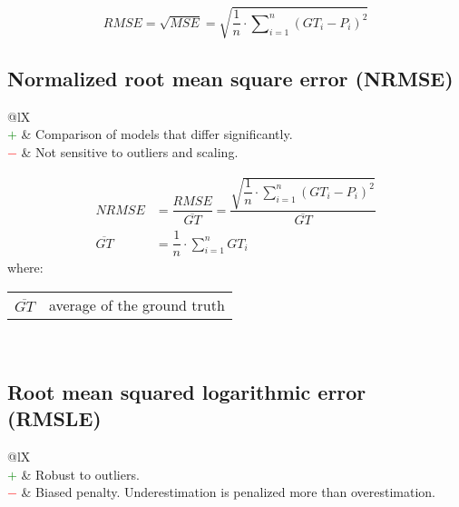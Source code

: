 \documentclass{article}
\makeatletter
\newenvironment{conditions}[1][where:]
    {\hspace{0.02\textwidth} #1 \begin{tabular}[t]{>{$}l<{$} @{${}={}$} l}}
    {\end{tabular}\\[\belowdisplayskip]}
\makeatother
\begin{document}
\begin{equation}
    \textit{RMSE} = \sqrt{\textit{MSE}} = \sqrt{\dfrac{1}{n} \cdot \sum\nolimits_{i = 1}^n (\textit{GT}_i - P_i)^2}
%
    \label{equation:RMSE}
\end{equation}


\subsection[Normalized root mean square error (NRMSE)]{Normalized root mean square error (NRMSE) \cite{chang2004air, kim2005missing}}

\begin{table}[H]\centering
    \begin{tabularx}{\textwidth}{@{}lX}
        \multicolumn{2}{@{}X}{Normalization of RMSE. (range: $[0, \infty)$)} \\
        \textcolor{Green}{$+$} & Comparison of models that differ significantly. \\
        \textcolor{Red}{$-$}   & Not sensitive to outliers and scaling.
    \end{tabularx}
\end{table}

\begin{equation}
    \begin{aligned}
        \textit{NRMSE}         &= \dfrac{\textit{RMSE}}{\overline{\textit{GT}}} = \dfrac{\sqrt{\dfrac{1}{n} \cdot \sum\nolimits_{i = 1}^n (\textit{GT}_i - P_i)^2}}{\overline{\textit{GT}}} \\
        \overline{\textit{GT}} &= \dfrac{1}{n} \cdot \sum\nolimits_{i = 1}^n \textit{GT}_i
%
        \label{equation:NRMSE}
    \end{aligned}
\end{equation}
%
\begin{conditions}
    \overline{\textit{GT}} & average of the ground truth
\end{conditions}


\subsection[Root mean squared logarithmic error (RMSLE)]{Root mean squared logarithmic error (RMSLE) \cite{nafees2021predictive}}

\begin{table}[H]\centering
    \begin{tabularx}{\textwidth}{@{}lX}
        \multicolumn{2}{@{}X}{Calculates the mean squared error of the logarithmized ground truth in comparison to the logarithmized predictions. (range: $[0, \infty)$)} \\
        \textcolor{Green}{$+$} & Robust to outliers. \\
        \textcolor{Red}{$-$}   & Biased penalty. Underestimation is penalized more than overestimation.
    \end{tabularx}
\end{table}
\end{document}
